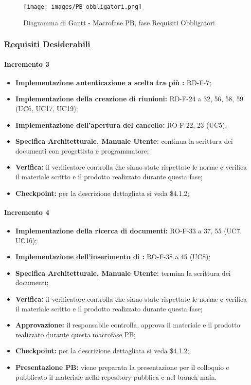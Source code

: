 \begin{landscape}
	\begin{figure}
	\texttt{[image: images/PB\_obbligatori.png]}
    \caption{Diagramma di Gantt - Macrofase PB, fase Requisiti Obbligatori}
	\end{figure}
\end{landscape}

\subsubsection{Requisiti Desiderabili}
\paragraph{Incremento 3}
\begin{itemize}
    \item \textbf{Implementazione autenticazione a scelta tra più :} RD-F-7;
    \item \textbf{Implementazione della creazione di riunioni:} RD-F-24 a 32, 56, 58, 59 (UC6, UC17, UC19);
    \item \textbf{Implementazione dell'apertura del cancello:} RO-F-22, 23 (UC5);
    \item \textbf{Specifica Architetturale, Manuale Utente:} continua la scrittura dei documenti con progettista e programmatore;
    \item \textbf{Verifica:} il verificatore controlla che siano state rispettate le norme e verifica il materiale scritto e il prodotto realizzato durante questa fase;
    \item \textbf{Checkpoint:} per la descrizione dettagliata si veda \$4.1.2;
\end{itemize}

\paragraph{Incremento 4}
\begin{itemize}
    \item \textbf{Implementazione della ricerca di documenti:} RO-F-33 a 37, 55 (UC7, UC16);
    \item \textbf{Implementazione dell'inserimento di :} RO-F-38 a 45 (UC8);
    \item \textbf{Specifica Architetturale, Manuale Utente:} termina la scrittura dei documenti;
    \item \textbf{Verifica:} il verificatore controlla che siano state rispettate le norme e verifica il materiale scritto e il prodotto realizzato durante questa fase;
    \item \textbf{Approvazione:} il responsabile controlla, approva il materiale e il prodotto realizzato durante questa macrofase PB;
    \item \textbf{Checkpoint:} per la descrizione dettagliata si veda \$4.1.2;
    \item \textbf{Presentazione PB:} viene preparata la presentazione per il colloquio e pubblicato il materiale nella repository pubblica e nel branch main.
\end{itemize}

